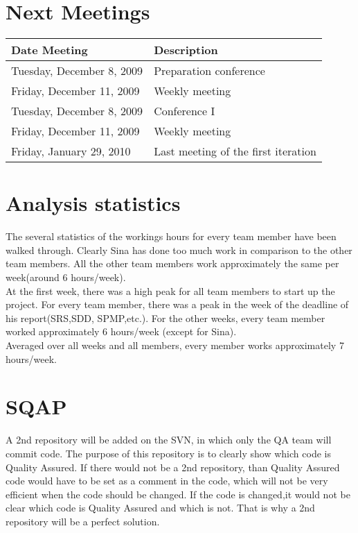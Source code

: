 \documentclass[a4paper, 12pt]{article}
\begin{document}
	\section{Next Meetings}
			\begin{tabular}{l | l }
				\textbf{Date Meeting} & \textbf{Description} \\
				\hline
				Tuesday, December 8, 2009 & Preparation conference \\
				Friday, December 11, 2009 & Weekly meeting \\
				Tuesday, December 8, 2009 & Conference I \\
				Friday, December 11, 2009 & Weekly meeting \\
				Friday, January 29, 2010 & Last meeting of the first iteration \\
			\end{tabular}	
	\section{Analysis statistics}
		The several statistics of the workings hours for every team member have been walked through. Clearly Sina has done too much work in comparison to the other team members. All the other team members work approximately the same per week(around 6 hours/week). \\
		At the first week, there was a high peak for all team members to start up the project. For every team member, there was a peak in the week of the deadline of his report(SRS,SDD, SPMP,etc.). For the other weeks, every team member worked approximately 6 hours/week (except for Sina). \\ Averaged over all weeks and all members, every member works approximately 7 hours/week. 
		

	\section{SQAP}
A 2nd repository will be added on the SVN, in which only the QA team will commit code. The purpose of this repository is to clearly show which code is Quality Assured. If there would not be a 2nd repository, than Quality Assured code would have to be set as a comment in the code, which will not be very efficient when the code should be changed. If the code is changed,it would not be clear which code is Quality Assured and which is not. That is why a 2nd repository will be a perfect solution.
 
\end{document}
